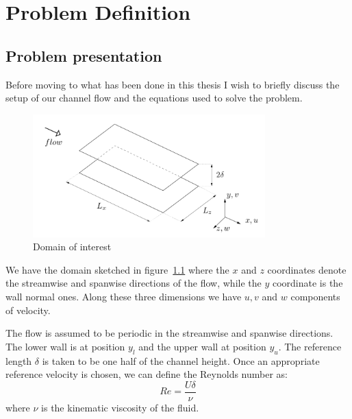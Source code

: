 \chapter{Problem Definition}


\section{Problem presentation}
\pagestyle{headings}

Before moving to what has been done in this thesis I wish to briefly discuss the setup of our channel flow and the equations used to solve the problem.

\begin{figure}[h]
\centering
\includegraphics[width=0.8\textwidth]{grafici/sketch_dominio}
\caption{Domain of interest}
\label{sketch_dominio}
\end{figure}

We have the domain sketched in figure~\ref{sketch_dominio} where the $x$ and $z$ coordinates denote the streamwise and spanwise directions of the flow, while the $y$ coordinate is the wall normal ones.
Along these three dimensions we have $u,v$ and $w$ components of velocity.

The flow is assumed to be periodic in the streamwise and spanwise directions. The lower wall is at position $y_l$ and the upper wall at position $y_u$. The reference length $\delta$ is taken to be one half of the channel height.
Once an appropriate reference velocity is chosen, we can define the Reynolds number as:
\[
Re = \frac{U\delta}{\nu}
\]
where $\nu$ is the kinematic viscosity of the fluid.

